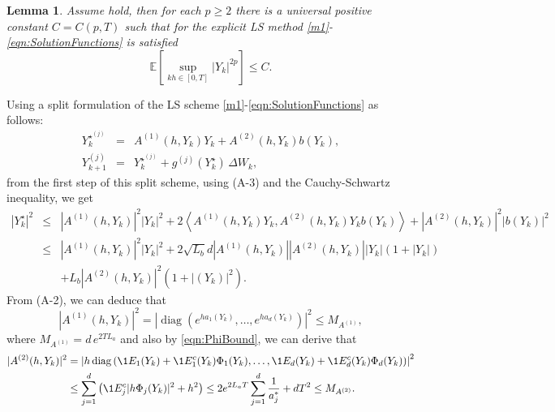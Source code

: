 \documentclass[sort&compress, preprint]{elsarticle}
\theoremstyle{definition}
\theoremstyle{plain}%
\newtheorem{lem}{Lemma}[section]
\theoremstyle{remark}
\newcommand{\m}[1]{\mathbb{E}#1}
\newcommand{\innerprod}[2]{\left\langle#1, #2\right\rangle}
\DeclareMathOperator{\diag}{diag}
\newcommand{\SM}{LS\xspace}
\begin{document}
\begin{lem}\label{lem:SSSMMomentBounds}
	Assume  hold, then for each $p\geq 2$ there is 
	a universal positive constant 
	$C=C(p,T)$ 
	such that for the explicit \SM method \eqref{m1}-\eqref{eqn:SolutionFunctions} is satisfied
	\begin{equation*}
		\m\left[
		\sup_{kh \in [0,T]}
		|Y_k|^{2p}
		\right]\leq C.
	\end{equation*}
\end{lem}
\begin{pf}
	Using a split formulation of the \SM scheme \eqref{m1}-\eqref{eqn:SolutionFunctions} as follows:
	\begin{eqnarray*}
 	Y_{k}^{{\star}^{(j)}} &=& A^{(1)}(h,Y_k) Y_k + A^{(2)}(h,Y_k) b(Y_k), \label{split1}\\
	Y_{k+1}^{(j)}&=& Y_k^{{\star}^{(j)}} + g^{(j)}(Y_k^{\star})\, \Delta W_k 
	\label{split2},
\end{eqnarray*}
	from the first step of this split scheme, using (A-3) and 
	the Cauchy-Schwartz inequality, we get
	\begin{eqnarray}
		|Y_k^{\star}|^{2}
		&\leq&
			|A^{(1)}(h,Y_k)|^2 |Y_k|^2  
			+ 2 \innerprod{A^{(1)}(h,Y_k)Y_k}{A^{(2)}(h,Y_k) Y_k b(Y_k)}
			+|A^{(2)}(h,Y_k)|^2 |b(Y_k)|^2\nonumber\\
		&\leq&
			|A^{(1)}(h,Y_k)|^2 |Y_k|^2  
		+ 2 \sqrt{L_b} d|A^{(1)}(h,Y_k)||A^{(2)}(h,Y_k)||Y_k|(1+|Y_k|)
		\label{leqn:Yn2Bound} 
		\\& & +L_b|A^{(2)}(h,Y_k)|^2 (1+|(Y_k)|^2). \nonumber
	\end{eqnarray}
	From (A-2), we can deduce that
	\begin{dmath}[label=eqn:A1Bound]
		|A^{(1)}(h,Y_k)|^2 
		=
			\left|
				\diag
				\left(
					e^{ha_1(Y_k)}, \dots, e^{ha_d(Y_k)} 
				\right)
			\right|^2
		\leq M_{A^{(1)}},		
	\end{dmath}
	where $M_{A^{(1)}}=d\, e^{ 2 T L_a}$ and also by \eqref{eqn:PhiBound}, we can derive that
	\begin{align}
		|A^{(2)}(h,Y_k)|^2 
		&=
		\left|
			h 
			\diag
			\left(
				\1{E_1}(Y_k)
				+\1{E_1^c}(Y_k)\Phi_1(Y_k), 
				\dots,
				\1{E_d}(Y_k)
				+\1{E_d^c}(Y_k) \Phi_d(Y_k)
			\right)
		\right|^2 \notag \\
		&\leq
		\sum_{j=1}^{d}
		\left(
			\1{E_j^c}
			|h\Phi_j(Y_k)|^2
			+ h^2
		\right)
		\leq
		2 e^{2 L_a  T}
				\sum_{j=1}^d
				\frac{1}{a_j^*} + d T^2\leq M_{A^{(2)}}.
		\label{eqn:A2Bound}
	\end{align}

\end{pf}
\end{document}
